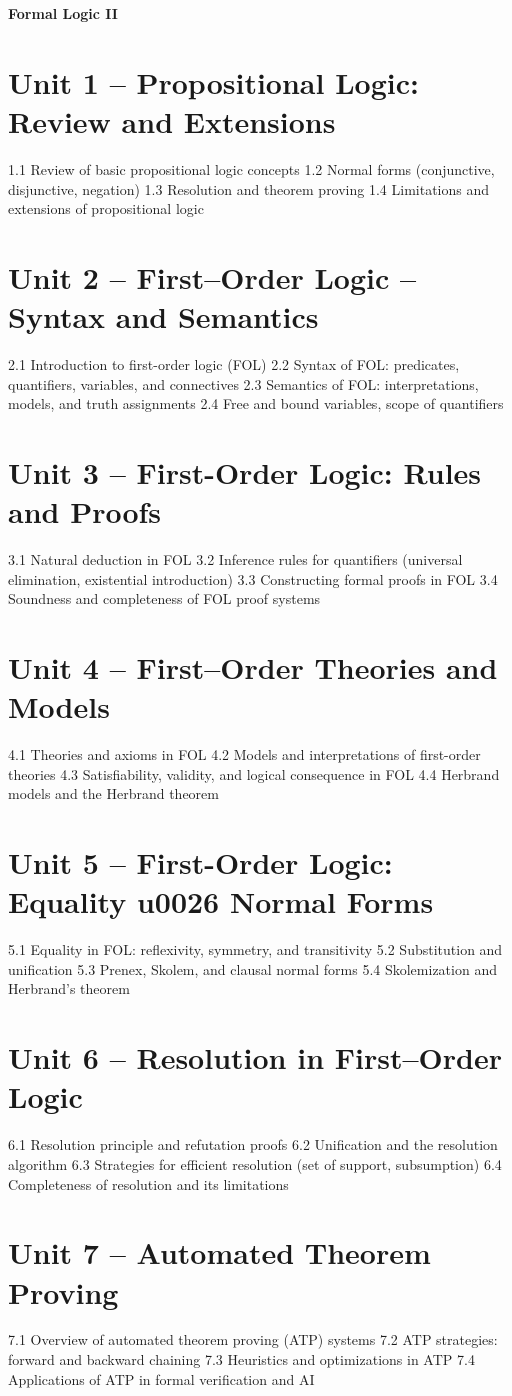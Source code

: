 {\LARGE \bf{Formal Logic II}}
\section{Unit 1 – Propositional Logic: Review and Extensions}
1.1 Review of basic propositional logic concepts
1.2 Normal forms (conjunctive, disjunctive, negation)
1.3 Resolution and theorem proving
1.4 Limitations and extensions of propositional logic
\section{Unit 2 – First–Order Logic – Syntax and Semantics}
2.1 Introduction to first-order logic (FOL)
2.2 Syntax of FOL: predicates, quantifiers, variables, and connectives
2.3 Semantics of FOL: interpretations, models, and truth assignments
2.4 Free and bound variables, scope of quantifiers
\section{Unit 3 – First-Order Logic: Rules and Proofs}
3.1 Natural deduction in FOL
3.2 Inference rules for quantifiers (universal elimination, existential introduction)
3.3 Constructing formal proofs in FOL
3.4 Soundness and completeness of FOL proof systems
\section{Unit 4 – First–Order Theories and Models}
4.1 Theories and axioms in FOL
4.2 Models and interpretations of first-order theories
4.3 Satisfiability, validity, and logical consequence in FOL
4.4 Herbrand models and the Herbrand theorem
\section{Unit 5 – First-Order Logic: Equality u0026 Normal Forms}
5.1 Equality in FOL: reflexivity, symmetry, and transitivity
5.2 Substitution and unification
5.3 Prenex, Skolem, and clausal normal forms
5.4 Skolemization and Herbrand's theorem
\section{Unit 6 – Resolution in First–Order Logic}
6.1 Resolution principle and refutation proofs
6.2 Unification and the resolution algorithm
6.3 Strategies for efficient resolution (set of support, subsumption)
6.4 Completeness of resolution and its limitations
\section{Unit 7 – Automated Theorem Proving}
7.1 Overview of automated theorem proving (ATP) systems
7.2 ATP strategies: forward and backward chaining
7.3 Heuristics and optimizations in ATP
7.4 Applications of ATP in formal verification and AI
